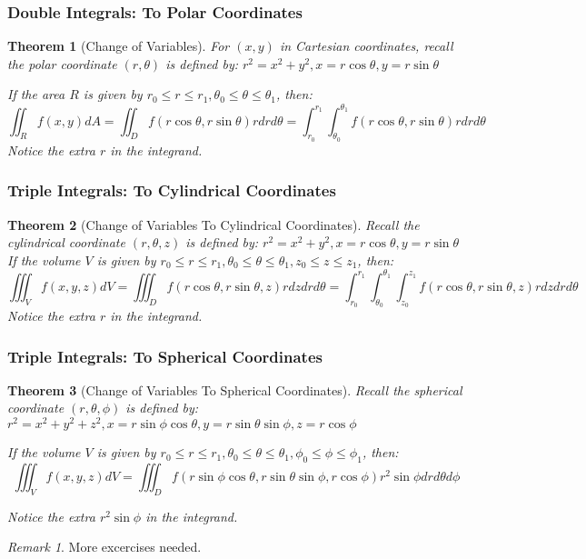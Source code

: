 \documentclass[12pt,a4paper]{article}
\newtheorem{theorem}{Theorem}[subsection]
\theoremstyle{definition}
\theoremstyle{remark}
\newtheorem{remark}{Remark}[section]
\begin{document}
\subsubsection{Double Integrals: To Polar Coordinates}
\begin{theorem}[Change of Variables]
For $(x, y)$ in Cartesian coordinates, recall the polar coordinate $(r, \theta)$ is defined by: $r^2 = x^2+y^2, x = r\cos{\theta}, y = r\sin{\theta}$

If the area $R$ is given by $r_0 \leq r \leq r_1, \theta_0 \leq \theta \leq \theta_1$, then:
\[
	\iint_R f(x,y) dA = \iint_D f(r\cos{\theta}, r\sin{\theta}) r dr d\theta
	= \int_{r_0}^{r_1} \int_{\theta_0}^{\theta_1} f(r\cos{\theta}, r\sin{\theta}) r dr d\theta
\]
Notice the extra $r$ in the integrand.
\end{theorem}

\subsubsection{Triple Integrals: To Cylindrical Coordinates}
\begin{theorem}[Change of Variables To Cylindrical Coordinates]
Recall the cylindrical coordinate $(r, \theta, z)$ is defined by: $r^2 = x^2+y^2, x = r\cos{\theta}, y = r\sin{\theta}$
If the volume $V$ is given by $r_0 \leq r \leq r_1, \theta_0 \leq \theta \leq \theta_1, z_0 \leq z \leq z_1$, then:
\[
	\iiint_V f(x,y,z) dV = \iiint_D f(r\cos{\theta}, r\sin{\theta}, z) r dz dr d\theta
	= \int_{r_0}^{r_1} \int_{\theta_0}^{\theta_1} \int_{z_0}^{z_1} f(r\cos{\theta}, r\sin{\theta}, z) r dz dr d\theta
\]
Notice the extra $r$ in the integrand.
\end{theorem}

\subsubsection{Triple Integrals: To Spherical Coordinates}
\begin{theorem}[Change of Variables To Spherical Coordinates]
Recall the spherical coordinate
$(r, \theta, \phi)$
is defined by: $r^2 = x^2+y^2+z^2, x = r\sin{\phi}\cos{\theta}, y = r\sin{\theta}\sin{\phi}, z = r\cos{\phi}$

If the volume $V$ is given by $r_0 \leq r \leq r_1, \theta_0 \leq \theta \leq \theta_1, \phi_0 \leq \phi \leq \phi_1$, then:
\[
	\iiint_V f(x,y,z) dV = \iiint_D f(r\sin{\phi}\cos{\theta}, r\sin{\theta}\sin{\phi}, r\cos{\phi}) r^2 \sin{\phi} dr d\theta d\phi
\]

Notice the extra $r^2 \sin{\phi}$ in the integrand.
\end{theorem}
\begin{remark}
	More excercises needed.
\end{remark}
\end{document}
